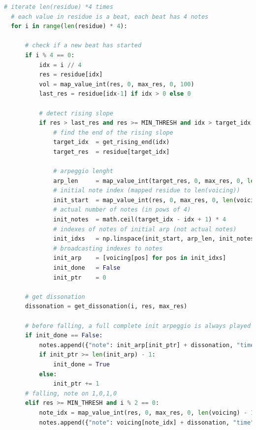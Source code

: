 \label{lst:residue}
\begin{lstlisting}[language=Python]
  # iterate len(residue) *4 times
  # each value in residue is a beat, each beat has 4 notes
  for i in range(len(residue) * 4):

      # check if a new beat has started
      if i % 4 == 0:
          idx = i // 4
          res = residue[idx]
          vol = map_value_int(res, 0, max_res, 0, 100)
          last_res = residue[idx-1] if idx > 0 else 0

          # detect rising slope
          if res > last_res and res >= MIN_THRESH and idx > target_idx:
              # find the end of the rising slope
              target_idx  = get_rising_end(idx)
              target_res  = residue[target_idx]

              # arpeggio lenght
              arp_len     = map_value_int(target_res, 0, max_res, 0, len(voicing)-1)
              # initial note index (mapped residue to len(voicing))  
              init_start  = map_value_int(res, 0, max_res, 0, len(voicing) - 1)       
              # actual number of notes (in pows of 4)
              init_notes  = math.ceil(target_idx - idx + 1) * 4                       
              # indexes of notes of initial arp (not actual notes)
              init_idxs   = np.linspace(init_start, arp_len, init_notes, dtype=int)   
              # broadcasting indexes to notes
              init_arp    = [voicing[pos] for pos in init_idxs]                       
              init_done   = False
              init_ptr    = 0

      # get dissonation
      dissonation = get_dissonation(i, res, max_res)

      # before falling, a full complete init arpeggio is always played
      if init_done == False:
          notes.append({"note": init_arp[init_ptr] + dissonation, "time": duration * i, "duration": duration, "volume": vol })
          if init_ptr >= len(init_arp) - 1:
              init_done = True
          else:
              init_ptr += 1
      # falling, note on 1,0,1,0
      elif res >= MIN_THRESH and i % 2 == 0:
          note_idx = map_value_int(res, 0, max_res, 0, len(voicing) - 1)
          notes.append({"note": voicing[note_idx] + dissonation, "time": duration * i, "duration": duration, "volume": vol })

\end{lstlisting}


